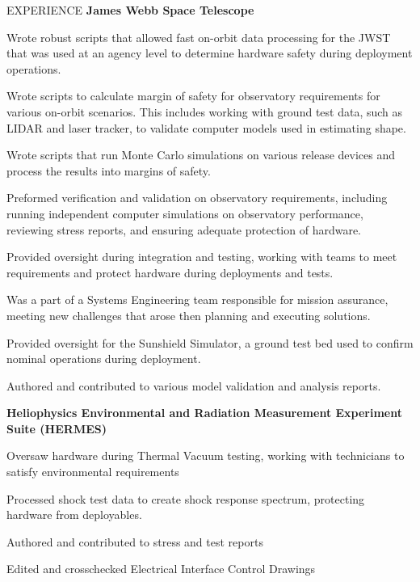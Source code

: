 \documentclass{resume} %
\begin{document}
\begin{newSection}{EXPERIENCE}
    \vspace{1mm}
    {\bf\hspace{0.6em} {James Webb Space Telescope} }
    \begin{myList}
        \item Wrote robust scripts that allowed fast on-orbit data processing for the JWST that was used at an agency level to determine hardware safety during deployment operations.
        \item Wrote scripts to calculate margin of safety for observatory requirements for various on-orbit scenarios. This includes working with ground test data, such as LIDAR and laser tracker, to validate computer models used in estimating shape.
        \item Wrote scripts that run Monte Carlo simulations on various release devices and process the results into margins of safety.
        \item Preformed verification and validation on observatory requirements, including running independent computer simulations on observatory performance, reviewing stress reports, and ensuring adequate protection of hardware.
        \item Provided oversight during integration and testing, working with teams to meet requirements and protect hardware during deployments and tests.
        \item Was a part of a Systems Engineering team responsible for mission assurance,  meeting new challenges that arose then planning and executing solutions.
        \item Provided oversight for the Sunshield Simulator, a ground test bed used to confirm nominal operations during deployment.
        \item Authored and contributed to various model validation and analysis reports.
        
    \end{myList}\vspace{1mm} \newpage

    {\bf\hspace{0.6em} {Heliophysics Environmental and Radiation Measurement Experiment Suite (HERMES)} }
    \begin{myList}
        \item Oversaw hardware during Thermal Vacuum testing, working with technicians to satisfy environmental requirements
        \item Processed shock test data to create shock response spectrum, protecting hardware from deployables.
        \item Authored and contributed to stress and test reports
        \item Edited and crosschecked Electrical Interface Control Drawings
    \end{myList}\vspace{1mm}


\end{newSection}
\end{document}
